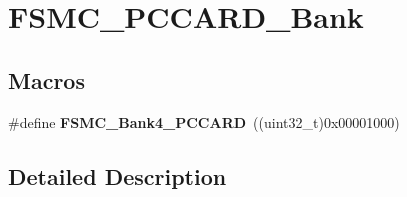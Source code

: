 \hypertarget{group___f_s_m_c___p_c_c_a_r_d___bank}{\section{F\-S\-M\-C\-\_\-\-P\-C\-C\-A\-R\-D\-\_\-\-Bank}
\label{group___f_s_m_c___p_c_c_a_r_d___bank}
}
\subsection*{Macros}
\begin{DoxyCompactItemize}
\item 
\hypertarget{group___f_s_m_c___p_c_c_a_r_d___bank_gad08ce7c7afc462f3d9ef085b05d42387}{\#define {\bfseries F\-S\-M\-C\-\_\-\-Bank4\-\_\-\-P\-C\-C\-A\-R\-D}~((uint32\-\_\-t)0x00001000)}\label{group___f_s_m_c___p_c_c_a_r_d___bank_gad08ce7c7afc462f3d9ef085b05d42387}

\end{DoxyCompactItemize}


\subsection{Detailed Description}
